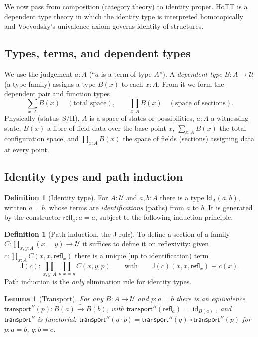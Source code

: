 \documentclass[12pt]{article}
\newtheorem{lemma}[theorem]{Lemma}
\theoremstyle{definition}
\newtheorem{definition}[theorem]{Definition}
\theoremstyle{remark}
\newcommand{\id}{\operatorname{id}}
\newcommand{\Univ}{\mathcal{U}}
\newcommand{\Refl}{\mathsf{refl}}
\newcommand{\transport}{\mathsf{transport}}
\begin{document}
We now pass from composition (category theory) to identity proper. HoTT is a
dependent type theory in which the identity type is interpreted homotopically and
Voevodsky's univalence axiom governs identity of structures.

\subsection{Types, terms, and dependent types}

We use the judgement $a:A$ (``$a$ is a term of type $A$''). A \emph{dependent
type} $B:A\to\Univ$ (a type family) assigns a type $B(x)$ to each $x:A$. From it
we form the dependent pair and function types
\begin{equation}
\label{eq:sigmapi}
\sum_{x:A}B(x)\quad(\text{total space}),\qquad
\prod_{x:A}B(x)\quad(\text{space of sections}).
\end{equation}
Physically (status~$\mathrm{S/H}$), $A$ is a space of states or possibilities,
$a:A$ a witnessing state, $B(x)$ a fibre of field data over the base point $x$,
$\sum_{x:A}B(x)$ the total configuration space, and $\prod_{x:A}B(x)$ the space
of fields (sections) assigning data at every point.

\subsection{Identity types and path induction}

\begin{definition}[Identity type]
\label{def:idtype}
For $A:\Univ$ and $a,b:A$ there is a type $\mathsf{Id}_A(a,b)$, written $a=b$,
whose terms are \emph{identifications} (paths) from $a$ to $b$. It is generated
by the constructor $\Refl_a:a=a$, subject to the following induction principle.
\end{definition}

\begin{definition}[Path induction, the J-rule]
\label{def:J}
To define a section of a family $C:\prod_{x,y:A}(x=y)\to\Univ$ it suffices to
define it on reflexivity: given
$c:\prod_{x:A}C(x,x,\Refl_x)$ there is a unique (up to identification) term
\[
\mathsf{J}(c):\prod_{x,y:A}\prod_{p:x=y}C(x,y,p)
\qquad\text{with}\qquad \mathsf{J}(c)(x,x,\Refl_x)\equiv c(x).
\]
Path induction is the \emph{only} elimination rule for identity types.
\end{definition}

\begin{lemma}[Transport]
\label{lem:transport}
For any $B:A\to\Univ$ and $p:a=b$ there is an equivalence
$\transport^{B}(p):B(a)\xrightarrow{\ \sim\ }B(b)$, with
$\transport^{B}(\Refl_a)=\id_{B(a)}$, and $\transport^{B}$ is functorial:
$\transport^{B}(q\cdot p)=\transport^{B}(q)\circ\transport^{B}(p)$ for
$p:a=b$, $q:b=c$.
\end{lemma}
\end{document}
